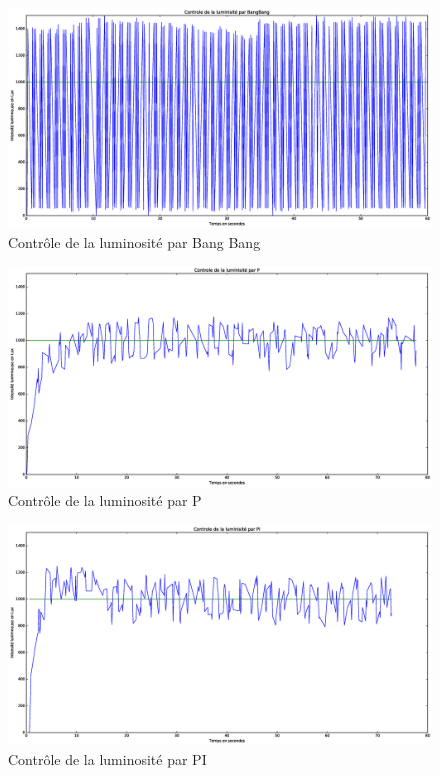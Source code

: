 \documentclass[a4paper,10pt]{report}
\begin{document}
\begin{figure}[htb!]
   \centering
   \includegraphics[scale=0.35]{BangBang.eps}
   \caption{\label{fig:Bang Bang} Contrôle de la luminosité par Bang Bang}
\end{figure}

\begin{figure}[htb!]
   \centering
   \includegraphics[scale=0.35]{P.eps}
   \caption{\label{fig:p} Contrôle de la luminosité par P}
\end{figure}

\begin{figure}[htb!]
   \centering
   \includegraphics[scale=0.35]{PI.eps}
   \caption{\label{fig:pi} Contrôle de la luminosité par PI}
\end{figure}
\end{document}
